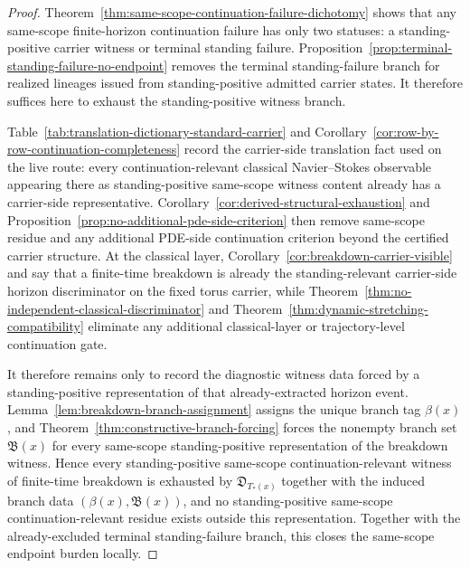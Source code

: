 \begin{proof}
Theorem~\ref{thm:same-scope-continuation-failure-dichotomy} shows that any same-scope finite-horizon continuation failure has only two statuses: a standing-positive carrier witness or terminal standing failure. Proposition~\ref{prop:terminal-standing-failure-no-endpoint} removes the terminal standing-failure branch for realized lineages issued from standing-positive admitted carrier states. It therefore suffices here to exhaust the standing-positive witness branch.

Table~\ref{tab:translation-dictionary-standard-carrier} and Corollary~\ref{cor:row-by-row-continuation-completeness} record the carrier-side translation fact used on the live route: every continuation-relevant classical Navier--Stokes observable appearing there as standing-positive same-scope witness content already has a carrier-side representative. Corollary~\ref{cor:derived-structural-exhaustion} and Proposition~\ref{prop:no-additional-pde-side-criterion} then remove same-scope residue and any additional PDE-side continuation criterion beyond the certified carrier structure. At the classical layer, Corollary~\ref{cor:breakdown-carrier-visible} and \HorizonDetectabilityRef{} say that a finite-time breakdown is already the standing-relevant carrier-side horizon discriminator on the fixed torus carrier, while Theorem~\ref{thm:no-independent-classical-discriminator} and Theorem~\ref{thm:dynamic-stretching-compatibility} eliminate any additional classical-layer or trajectory-level continuation gate.

It therefore remains only to record the diagnostic witness data forced by a standing-positive representation of that already-extracted horizon event. Lemma~\ref{lem:breakdown-branch-assignment} assigns the unique branch tag $\beta(x)$, and Theorem~\ref{thm:constructive-branch-forcing} forces the nonempty branch set $\mathfrak B(x)$ for every same-scope standing-positive representation of the breakdown witness. Hence every standing-positive same-scope continuation-relevant witness of finite-time breakdown is exhausted by $\mathfrak D_{T_*(x)}$ together with the induced branch data $(\beta(x),\mathfrak B(x))$, and no standing-positive same-scope continuation-relevant residue exists outside this representation. Together with the already-excluded terminal standing-failure branch, this closes the same-scope endpoint burden locally.
\end{proof}

